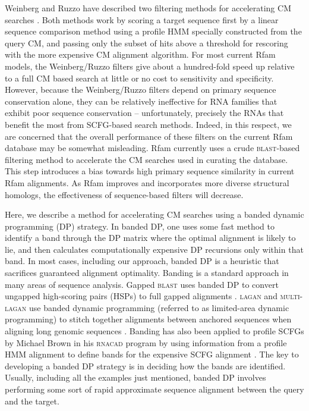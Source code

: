 \documentclass[11pt]{article}
\begin{document}
Weinberg and Ruzzo have described two filtering methods for
accelerating CM searches
\cite{WeinbergRuzzo04,WeinbergRuzzo04b,WeinbergRuzzo06}. Both methods
work by scoring a target sequence first by a linear sequence
comparison method using a profile HMM specially constructed from the
query CM, and passing only the subset of hits above a threshold for
rescoring with the more expensive CM alignment algorithm.  For most
current Rfam models, the Weinberg/Ruzzo filters give about a
hundred-fold speed up relative to a full CM based search at little or
no cost to sensitivity and specificity. However, because the
Weinberg/Ruzzo filters depend on primary sequence conservation alone,
they can be relatively ineffective for RNA families that exhibit poor
sequence conservation -- unfortunately, precisely the RNAs that
benefit the most from SCFG-based search methods.  Indeed, in this
respect, we are concerned that the overall performance of these
filters on the current Rfam database may be somewhat misleading. Rfam
currently uses a crude \textsc{blast}-based filtering method to
accelerate the CM searches used in curating the database. This step
introduces a bias towards high primary sequence similarity in current
Rfam alignments. As Rfam improves and incorporates more diverse
structural homologs, the effectiveness of sequence-based filters will
decrease.

Here, we describe a method for accelerating CM searches using a banded
dynamic programming (DP) strategy. In banded DP, one uses some fast
method to identify a band through the DP matrix where the optimal
alignment is likely to lie, and then calculates computationally
expensive DP recursions only within that band. In most cases,
including our approach, banded DP is a heuristic that sacrifices
guaranteed alignment optimality. Banding is a standard approach in
many areas of sequence analysis. Gapped \textsc{blast} uses banded DP
to convert ungapped high-scoring pairs (HSPs) to full gapped
alignments \cite{Altschul97}.  \textsc{lagan} and \textsc{multi-lagan}
use banded dynamic programming (referred to as limited-area dynamic
programming) to stitch together alignments between anchored sequences
when aligning long genomic sequences \cite{Brudno03}. Banding has also been
applied to profile SCFGs by Michael Brown in his \textsc{rnacad}
program by using information from a profile HMM alignment to define
bands for the expensive SCFG alignment \cite{Brown00}. The key to
developing a banded DP strategy is in deciding how the bands are
identified.  Usually, including all the examples just mentioned,
banded DP involves performing some sort of rapid approximate sequence
alignment between the query and the target.
\end{document}
